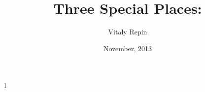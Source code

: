 \documentclass[a4paper]{article}
\author{Vitaly Repin}
\title{Three Special Places: \emph{\mycity}}
\date{November, 2013}
\begin{document}
1
\end{document}
